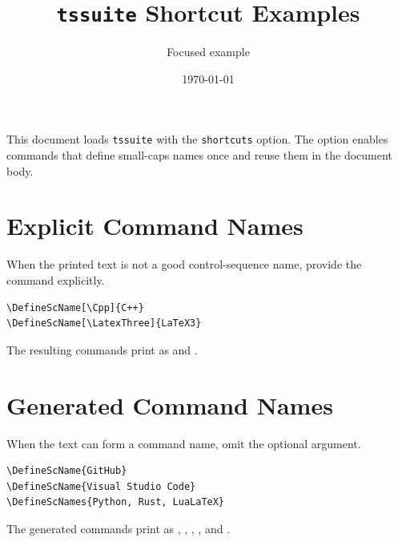 \documentclass[a4paper,11pt]{article}
\title{\texttt{tssuite} Shortcut Examples}
\author{Focused example}
\date{\today}
\begin{document}
\maketitle

This document loads \texttt{tssuite} with the \texttt{shortcuts} option. The
option enables commands that define small-caps names once and reuse them in the
document body.

\section{Explicit Command Names}

When the printed text is not a good control-sequence name, provide the command
explicitly.

\begin{verbatim}
\DefineScName[\Cpp]{C++}
\DefineScName[\LatexThree]{LaTeX3}
\end{verbatim}

The resulting commands print as \Cpp{} and \LatexThree.

\section{Generated Command Names}

When the text can form a command name, omit the optional argument.

\begin{verbatim}
\DefineScName{GitHub}
\DefineScName{Visual Studio Code}
\DefineScNames{Python, Rust, LuaLaTeX}
\end{verbatim}

The generated commands print as \GitHub, \VisualStudioCode, \Python, \Rust, and
\LuaLaTeX.
\end{document}
